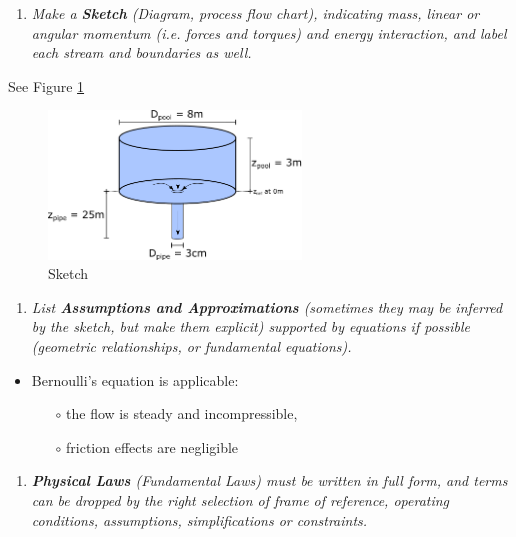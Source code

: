 \documentclass{article}
\begin{document}
\begin{enumerate}[resume]
\item \textit{Make a \textbf{Sketch} (Diagram, process flow chart), indicating mass, linear or angular momentum (i.e. forces and torques) and energy interaction, and label each stream and boundaries as well.}
\end{enumerate}

See Figure \ref{fig_FIGUREBernoulliEquation}

\begin{figure}[h!]
\centering
\includegraphics[width=0.60\textwidth]{./img/FIGUREBernoulliEquation.png}
\caption{Sketch}
\label{fig_FIGUREBernoulliEquation}
\end{figure}

\begin{enumerate}[resume]
\item \textit{List \textbf{Assumptions and Approximations} (sometimes they may be inferred by the sketch, but make them explicit) supported by equations if possible (geometric relationships, or fundamental equations).}
\end{enumerate}

\begin{itemize}
\item Bernoulli's equation is applicable:
    \begin{itemize}
    \item[$\circ$] the flow is steady and incompressible,
    \item[$\circ$] friction effects are negligible
    \end{itemize}
\end{itemize}

\begin{enumerate}[resume]
\item \textit{\textbf{Physical Laws} (Fundamental Laws) must be written in full form, and terms can be dropped by the right selection of frame of reference, operating conditions, assumptions, simplifications or constraints.}
\end{enumerate}
\end{document}
